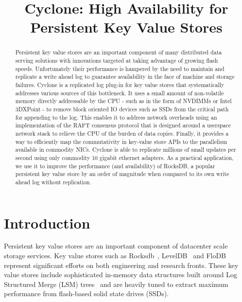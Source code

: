 \documentclass[pageno]{jpaper}
\begin{document}
\title{\Large \bf Cyclone: High Availability for Persistent Key Value Stores}


\date{}
\maketitle


\begin{abstract}
\vspace{0.05in}
Persistent key value stores are an important component of many distributed data
serving solutions with innovations targeted at taking advantage of growing flash
speeds. Unfortunately their performance is hampered by the need to maintain and
replicate a write ahead log to guarantee availability in the face of machine and
storage failures. Cyclone is a replicated log plug-in for key value stores that
systematically addresses various sources of this bottleneck. It uses a small
amount of non-volatile memory directly addressable by the CPU - such as in the
form of NVDIMMs or Intel 3DXPoint - to remove block oriented IO devices such as
SSDs from the critical path for appending to the log. This enables it to address network
overheads using an implementation of the RAFT consensus protocol that is
designed around a userspace network stack to relieve the CPU of the burden of
data copies. Finally, it provides a way to efficiently map the commutativity in
key-value store APIs to the parallelism available in commodity NICs.
Cyclone is able to replicate millions of small updates per second
using only commodity 10 gigabit ethernet adapters. As a practical application,
we use it to improve the performance (and availability) of RocksDB, a popular
persistent key value store by an order of magnitude when compared to its own
write ahead log without replication.
\end{abstract}

\section{Introduction}
Persistent key value stores are an important component of datacenter scale
storage services. Key value stores such as Rocksdb~\cite{rocksdb},
LevelDB~\cite{leveldb} and FloDB~\cite{flodb} represent significant efforts on
both engineering and research fronts. These key value stores include
sophisticated in-memory data structures built around Log Structured Merge (LSM)
trees~\cite{lsmtree} and are heavily tuned to extract maximum performance from
flash-based solid state drives (SSDs).
\end{document}
